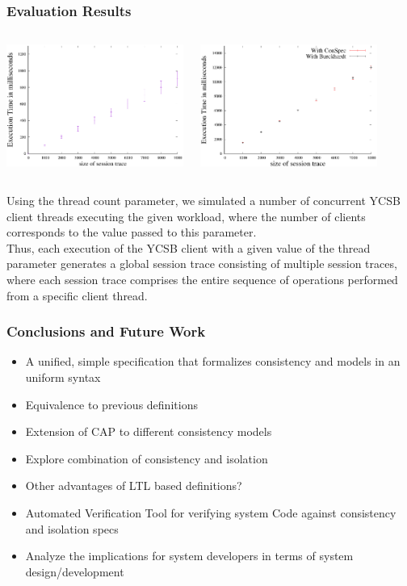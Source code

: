 \documentclass{beamer}
\begin{document}
\begin{frame}
\frametitle{Evaluation Results}

\begin{columns}
	
	\includegraphics[height=4cm]{conspecYCSBvarhist.eps}
	
	\includegraphics[height=4cm]{conspecTPCCvarhist.eps}
\end{columns}
Using the thread count parameter, we simulated a number of concurrent YCSB client threads executing the given workload,  where the number of clients corresponds to the value passed to this parameter.\\
Thus, each execution of the YCSB client with a given value of the thread parameter generates a global session trace consisting of multiple session traces, where each session trace comprises the entire sequence of operations performed from a specific client thread.

\end{frame}

\begin{frame}
\frametitle{Conclusions and Future Work}
\begin{itemize}
	\item A unified, simple specification that formalizes  consistency and models in an uniform syntax
	\item Equivalence to previous definitions
	\item Extension of CAP to different consistency models
	\item Explore combination of consistency and isolation
	\item Other advantages of LTL based definitions?
	\item Automated Verification Tool for verifying system Code against consistency and isolation specs
	\item Analyze the implications for system developers in terms of system design/development
\end{itemize}

\end{frame}
\end{document}
